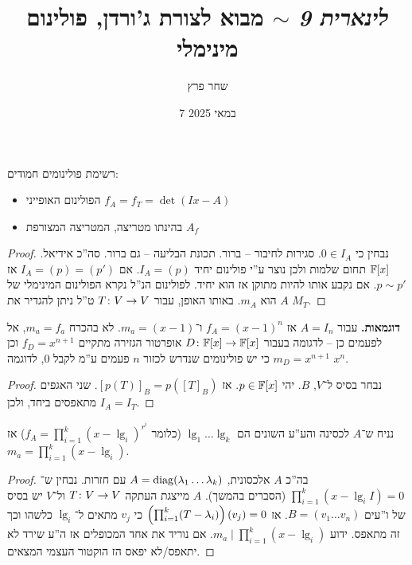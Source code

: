 \documentclass[]{../../../../tex/classes/styledArticle}
\author{שחר פרץ}
\title{\textit{לינארית 9} $\sim$ מבוא לצורת ג'ורדן, פולינום מינימלי}
\date{7 במאי 2025}
\begin{document}
    \maketitle
    רשימת פולינומים חמודים: 
    \begin{itemize}
        \item הפולינום האופייני $f_A = f_T = \det(Ix - A)$
        \item בהינתו מטריצה, המטריצה המצורפת $A_f$
    \end{itemize}
    
    \begin{proof}
        נבחין כי $0 \in I_A$. סגירות לחיבור – ברור. תכונת הבליעה – גם ברור. סה''כ אידיאל. 
        $\mathbb{F}[x]$ תחום שלמות ולכן נוצר ע''י פולינום יחיד $I_A = (p)$. אם $I_A = (p) = (p')$ אז $p \sim p'$. אם נקבע אותו להיות מתוקן אז הוא יחיד. לפולינום הנ''ל נקרא הפולינום המינימלי של $A$ הוא $m_A$. באותו האופן, עבור $T \colon V \to V$ ט''ל ניתן להגדיר את $M_T$. 
    \end{proof}
    
    
    
    \textbf{דוגמאות. }עבור $A = I_n$ אז $f_A = (x - 1)^{n}$ ו־$m_a = (x - 1)$. לא בהכרח $m_a = f_a$, אל לפעמים כן – לדגומה בעבור $D \colon \mathbb{F}[x] \to \mathbb{F}[x]$ אופרטור הגזירה מתקיים $f_D = x^{n + 1}$ וכן $m_D = x^{n + 1}$ כי יש פולינומים שנדרש לכזור $n$ פעמים ע''מ לקבל $0$, לדוגמה $x^{n}$. 
    
    \begin{proof}
        נבחר בסיס ל־$V$, $B$. יהי $p \in \mathbb{F}[x]$. אז $[p(T)]_B = p([T]_B)$. שני האגפים מתאפסים ביחד, ולכן $I_A = I_T$. 
    \end{proof}
    \begin{Collary}
        נניח ש־$A$ לכסינה והע''ע השונים הם $\lg_1 \dots \lg_k$ (כלומר $f_A = \prod_{i = 1}^{k}(x - \lg_i)^{r^i}$) אז $m_a = \prod_{i = 1}^{k}(x - \lg_i)$. 
    \end{Collary}
    \begin{proof}
        בה''כ $A$ אלכסונית, $A = \operatorname{diag}(\lambda_1 \dots \lambda_k)$ עם חזרות. נבחין ש־$\prod_{i = 1}^{k} (x - \lg_iI) = 0$ (הסברים בהמשך). $A$ מייצגת העתקה $T \colon V \to V$ ול־$V$ יש בסיס של ו''עים $B = (v_1 \dots v_n)$.  אז $\left ( \prod_{i = 1}^{k}(T - \lambda_i) \right )(v_j) = 0$ כי $v_j$ מתאים ל־$\lg_i$ כלשהו וכך זה מתאפס. ידוע $m_a \mid \prod_{i = 1}^{k}(x - \lg_i)$. אם נוריד את אחד המכופלים אז ה''ע שירד לא יתאפס/לא יפאס הז הוקטור העצמי המצאים. 
    \end{proof}
    
\end{document}
